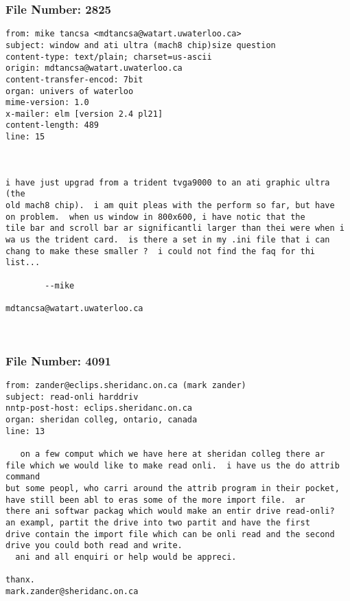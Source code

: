 \subsubsection*{File Number: 2825}
\scriptsize\begin{verbatim}
from: mike tancsa <mdtancsa@watart.uwaterloo.ca>
subject: window and ati ultra (mach8 chip)size question
content-type: text/plain; charset=us-ascii
origin: mdtancsa@watart.uwaterloo.ca
content-transfer-encod: 7bit
organ: univers of waterloo
mime-version: 1.0
x-mailer: elm [version 2.4 pl21]
content-length: 489       
line: 15



i have just upgrad from a trident tvga9000 to an ati graphic ultra (the
old mach8 chip).  i am quit pleas with the perform so far, but have
on problem.  when us window in 800x600, i have notic that the 
tile bar and scroll bar ar significantli larger than thei were when i
wa us the trident card.  is there a set in my .ini file that i can
chang to make these smaller ?  i could not find the faq for thi list...

		--mike

mdtancsa@watart.uwaterloo.ca



\end{verbatim}
\subsubsection*{File Number: 4091}
\scriptsize\begin{verbatim}
from: zander@eclips.sheridanc.on.ca (mark zander)
subject: read-onli harddriv
nntp-post-host: eclips.sheridanc.on.ca
organ: sheridan colleg, ontario, canada
line: 13

   on a few comput which we have here at sheridan colleg there ar
file which we would like to make read onli.  i have us the do attrib command
but some peopl, who carri around the attrib program in their pocket,
have still been abl to eras some of the more import file.  ar
there ani softwar packag which would make an entir drive read-onli?
an exampl, partit the drive into two partit and have the first
drive contain the import file which can be onli read and the second
drive you could both read and write.  
  ani and all enquiri or help would be appreci.

thanx.
mark.zander@sheridanc.on.ca
 
\end{verbatim}
